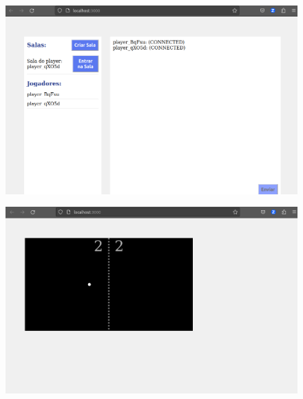 \documentclass[12pt,openright,oneside,a4paper,brazil,article]{abntex2}
\begin{document}
\begin{enumerate}
    \begin{center}
      \begin{figure}
        \includegraphics[scale=1]{gamescreen1.png}
      \end{figure}  
    \end{center}
    

    \begin{center}
      \begin{figure}
        \includegraphics[scale=1]{gamescreen2.png}
      \end{figure}  
    \end{center}
  \end{enumerate}
\end{document}
